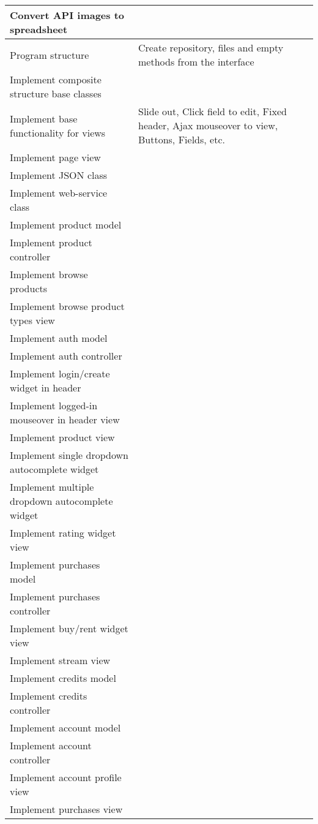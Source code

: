 \begin{longtable}{|p{200px}|p{200px}|}
\hline \hline
\endlastfoot
    \hline
	Convert API images to spreadsheet & ~  \\ \hline
	Program structure & Create repository, files and empty methods from the interface \\ \hline
	Implement composite structure base classes & ~ \\ \hline
	Implement base functionality for views & Slide out, Click field to edit, Fixed header, Ajax mouseover to view, Buttons, Fields,	etc. \\ \hline
	Implement page view & ~  \\ \hline
	Implement JSON class & ~  \\ \hline
	Implement web-service class & ~ \\ \hline
	Implement product model & ~  \\ \hline
	Implement product controller & ~  \\ \hline
	Implement browse products & ~  \\ \hline
	Implement browse product types view & ~  \\
	Implement auth model & ~  \\ \hline
	Implement auth controller & ~  \\ \hline
	Implement login/create widget in header & ~  \\ \hline
	Implement logged-in mouseover in header view & ~  \\ \hline
	Implement product view & ~  \\ \hline
	Implement single dropdown autocomplete widget & ~  \\ \hline
	Implement multiple dropdown autocomplete widget & ~  \\ \hline
	Implement rating widget view & ~  \\ \hline
	Implement purchases model & ~  \\ \hline
	Implement purchases controller & ~  \\ \hline
	Implement buy/rent widget view & ~  \\ \hline
	Implement stream view & ~  \\ \hline
	Implement credits model & ~  \\ \hline
	Implement credits controller & ~  \\ \hline
	Implement account model & ~  \\ \hline
	Implement account controller & ~  \\ \hline
	Implement account profile view & ~  \\ \hline
	Implement purchases view & ~  \\ \hline

\end{longtable}
